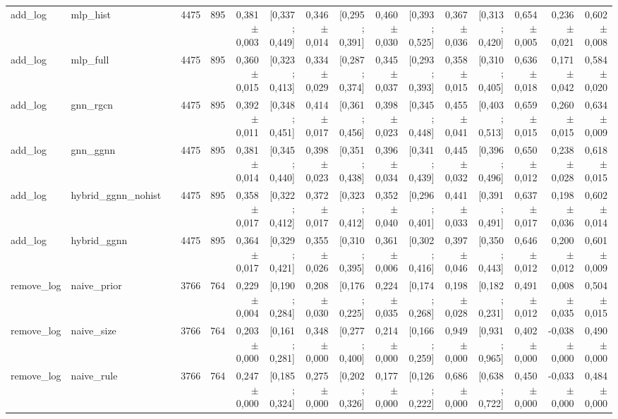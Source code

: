\begin{table}[htbp]
{\begin{tabular}{llrrrrrrrrrrrrrr}
add\_log & mlp\_hist &  & 4475 & 895 & 0,381 $\pm$ 0,003 & [0,337 ; 0,449] & 0,346 $\pm$ 0,014 & [0,295 ; 0,391] & 0,460 $\pm$ 0,030 & [0,393 ; 0,525] & 0,367 $\pm$ 0,036 & [0,313 ; 0,420] & 0,654 $\pm$ 0,005 & 0,236 $\pm$ 0,021 & 0,602 $\pm$ 0,008 \\
add\_log & mlp\_full &  & 4475 & 895 & 0,360 $\pm$ 0,015 & [0,323 ; 0,413] & 0,334 $\pm$ 0,029 & [0,287 ; 0,374] & 0,345 $\pm$ 0,037 & [0,293 ; 0,393] & 0,358 $\pm$ 0,015 & [0,310 ; 0,405] & 0,636 $\pm$ 0,018 & 0,171 $\pm$ 0,042 & 0,584 $\pm$ 0,020 \\
add\_log & gnn\_rgcn &  & 4475 & 895 & 0,392 $\pm$ 0,011 & [0,348 ; 0,451] & 0,414 $\pm$ 0,017 & [0,361 ; 0,456] & 0,398 $\pm$ 0,023 & [0,345 ; 0,448] & 0,455 $\pm$ 0,041 & [0,403 ; 0,513] & 0,659 $\pm$ 0,015 & 0,260 $\pm$ 0,015 & 0,634 $\pm$ 0,009 \\
add\_log & gnn\_ggnn &  & 4475 & 895 & 0,381 $\pm$ 0,014 & [0,345 ; 0,440] & 0,398 $\pm$ 0,023 & [0,351 ; 0,438] & 0,396 $\pm$ 0,034 & [0,341 ; 0,439] & 0,445 $\pm$ 0,032 & [0,396 ; 0,496] & 0,650 $\pm$ 0,012 & 0,238 $\pm$ 0,028 & 0,618 $\pm$ 0,015 \\
add\_log & hybrid\_ggnn\_nohist &  & 4475 & 895 & 0,358 $\pm$ 0,017 & [0,322 ; 0,412] & 0,372 $\pm$ 0,017 & [0,323 ; 0,412] & 0,352 $\pm$ 0,040 & [0,296 ; 0,401] & 0,441 $\pm$ 0,033 & [0,391 ; 0,491] & 0,637 $\pm$ 0,017 & 0,198 $\pm$ 0,036 & 0,602 $\pm$ 0,014 \\
add\_log & hybrid\_ggnn &  & 4475 & 895 & 0,364 $\pm$ 0,017 & [0,329 ; 0,421] & 0,355 $\pm$ 0,026 & [0,310 ; 0,395] & 0,361 $\pm$ 0,006 & [0,302 ; 0,416] & 0,397 $\pm$ 0,046 & [0,350 ; 0,443] & 0,646 $\pm$ 0,012 & 0,200 $\pm$ 0,012 & 0,601 $\pm$ 0,009 \\
remove\_log & naive\_prior &  & 3766 & 764 & 0,229 $\pm$ 0,004 & [0,190 ; 0,284] & 0,208 $\pm$ 0,030 & [0,176 ; 0,225] & 0,224 $\pm$ 0,035 & [0,174 ; 0,268] & 0,198 $\pm$ 0,028 & [0,182 ; 0,231] & 0,491 $\pm$ 0,012 & 0,008 $\pm$ 0,035 & 0,504 $\pm$ 0,015 \\
remove\_log & naive\_size &  & 3766 & 764 & 0,203 $\pm$ 0,000 & [0,161 ; 0,281] & 0,348 $\pm$ 0,000 & [0,277 ; 0,400] & 0,214 $\pm$ 0,000 & [0,166 ; 0,259] & 0,949 $\pm$ 0,000 & [0,931 ; 0,965] & 0,402 $\pm$ 0,000 & -0,038 $\pm$ 0,000 & 0,490 $\pm$ 0,000 \\
remove\_log & naive\_rule &  & 3766 & 764 & 0,247 $\pm$ 0,000 & [0,185 ; 0,324] & 0,275 $\pm$ 0,000 & [0,202 ; 0,326] & 0,177 $\pm$ 0,000 & [0,126 ; 0,222] & 0,686 $\pm$ 0,000 & [0,638 ; 0,722] & 0,450 $\pm$ 0,000 & -0,033 $\pm$ 0,000 & 0,484 $\pm$ 0,000 \\

\end{tabular}}
\end{table}
